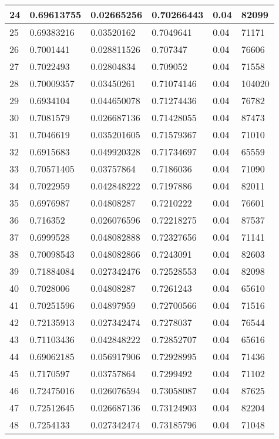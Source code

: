 \begin{longtable}{|l|l|l|l|l|l|}
24 & 0.69613755 & 0.02665256 & 0.70266443 & 0.04 & 82099 \\ \hline 
25 & 0.69383216 & 0.03520162 & 0.7049641 & 0.04 & 71171 \\ \hline 
26 & 0.7001441 & 0.028811526 & 0.707347 & 0.04 & 76606 \\ \hline 
27 & 0.7022493 & 0.02804834 & 0.709052 & 0.04 & 71558 \\ \hline 
28 & 0.70009357 & 0.03450261 & 0.71074146 & 0.04 & 104020 \\ \hline 
29 & 0.6934104 & 0.044650078 & 0.71274436 & 0.04 & 76782 \\ \hline 
30 & 0.7081579 & 0.026687136 & 0.71428055 & 0.04 & 87473 \\ \hline 
31 & 0.7046619 & 0.035201605 & 0.71579367 & 0.04 & 71010 \\ \hline 
32 & 0.6915683 & 0.049920328 & 0.71734697 & 0.04 & 65559 \\ \hline 
33 & 0.70571405 & 0.03757864 & 0.7186036 & 0.04 & 71090 \\ \hline 
34 & 0.7022959 & 0.042848222 & 0.7197886 & 0.04 & 82011 \\ \hline 
35 & 0.6976987 & 0.04808287 & 0.7210222 & 0.04 & 76601 \\ \hline 
36 & 0.716352 & 0.026076596 & 0.72218275 & 0.04 & 87537 \\ \hline 
37 & 0.6999528 & 0.048082888 & 0.72327656 & 0.04 & 71141 \\ \hline 
38 & 0.70098543 & 0.048082866 & 0.7243091 & 0.04 & 82603 \\ \hline 
39 & 0.71884084 & 0.027342476 & 0.72528553 & 0.04 & 82098 \\ \hline 
40 & 0.7028006 & 0.04808287 & 0.7261243 & 0.04 & 65610 \\ \hline 
41 & 0.70251596 & 0.04897959 & 0.72700566 & 0.04 & 71516 \\ \hline 
42 & 0.72135913 & 0.027342474 & 0.7278037 & 0.04 & 76544 \\ \hline 
43 & 0.71103436 & 0.042848222 & 0.72852707 & 0.04 & 65616 \\ \hline 
44 & 0.69062185 & 0.056917906 & 0.72928995 & 0.04 & 71436 \\ \hline 
45 & 0.7170597 & 0.03757864 & 0.7299492 & 0.04 & 71102 \\ \hline 
46 & 0.72475016 & 0.026076594 & 0.73058087 & 0.04 & 87625 \\ \hline 
47 & 0.72512645 & 0.026687136 & 0.73124903 & 0.04 & 82204 \\ \hline 
48 & 0.7254133 & 0.027342474 & 0.73185796 & 0.04 & 71048 \\ \hline 

\end{longtable}
